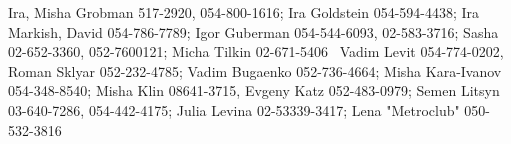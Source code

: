 \documentclass[12pt]{article}
\begin{document}
\begin{itemize}
Ira, Misha Grobman 517-2920, 054-800-1616; 
Ira Goldstein 
 054-594-4438; 
 Ira Markish, David 054-786-7789;
Igor Guberman 054-544-6093, 02-583-3716;
Sasha 02-652-3360, 052-7600121; 
 Micha Tilkin 
02-671-5406\,\,\,
Vadim Levit 054-774-0202, 
Roman Sklyar  052-232-4785; Vadim Bugaenko 
052-736-4664; Misha Kara-Ivanov 054-348-8540;
 Misha Klin 08641-3715, Evgeny Katz 052-483-0979; Semen Litsyn 
03-640-7286, 054-442-4175; 
 Julia Levina 02-53339-3417; Lena "Metroclub" 050-532-3816



\end {itemize}
\end{document}
